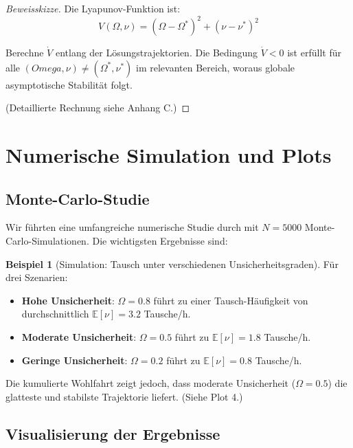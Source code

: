 \documentclass[a4paper,12pt]{article}
\theoremstyle{definition}
\newtheorem{beispiel}{Beispiel}
\begin{document}
\begin{proof}[Beweisskizze]
    Die Lyapunov-Funktion ist:
    \begin{equation}
        V(\Omega, \nu) = (\Omega - \Omega^*)^2 + (\nu - \nu^*)^2
    \end{equation}
    
    Berechne $\dot{V}$ entlang der Lösungstrajektorien. Die Bedingung $\dot{V} < 0$ ist erfüllt für alle $(Omega, \nu) \neq (\Omega^*, \nu^*)$ im relevanten Bereich, woraus globale asymptotische Stabilität folgt.
    
    (Detaillierte Rechnung siehe Anhang C.)
\end{proof}

\section{Numerische Simulation und Plots}

\subsection{Monte-Carlo-Studie}

Wir führten eine umfangreiche numerische Studie durch mit $N = 5000$ Monte-Carlo-Simulationen. Die wichtigsten Ergebnisse sind:

\begin{beispiel}[Simulation: Tausch unter verschiedenen Unsicherheitsgraden]
    Für drei Szenarien:
    \begin{itemize}
        \item \textbf{Hohe Unsicherheit}: $\Omega = 0.8$ führt zu einer Tausch-Häufigkeit von durchschnittlich $\mathbb{E}[\nu] = 3.2$ Tausche/h.
        \item \textbf{Moderate Unsicherheit}: $\Omega = 0.5$ führt zu $\mathbb{E}[\nu] = 1.8$ Tausche/h.
        \item \textbf{Geringe Unsicherheit}: $\Omega = 0.2$ führt zu $\mathbb{E}[\nu] = 0.8$ Tausche/h.
    \end{itemize}
    
    Die kumulierte Wohlfahrt zeigt jedoch, dass moderate Unsicherheit ($\Omega = 0.5$) die glatteste und stabilste Trajektorie liefert. (Siehe Plot 4.)
\end{beispiel}

\subsection{Visualisierung der Ergebnisse}
\end{document}
